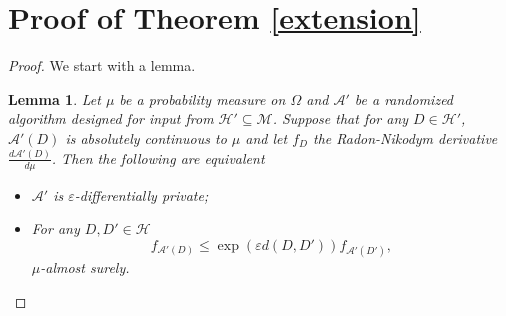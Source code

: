 \documentclass[12pt,a4paper]{article}
\numberwithin{equation}{section}
\newtheorem{lemma}[theorem]{Lemma}
\numberwithin{equation}{section}
\renewcommand{\epsilon}{\varepsilon}
\newcommand{\1}{{\text{\Large $\mathfrak 1$}}}
\newcommand{\2}[1]{{\text{\Large $\mathfrak 1$}\!\left(#1\right)}}
\begin{document}
\section{Proof of Theorem \ref{extension}}
\begin{proof}  We start with a lemma.
\begin{lemma}\label{lem}
Let $\mu$ be a probability measure on $\Omega$ and $\mathcal{A}'$ be a randomized algorithm designed for input from $\mathcal{H}' \subseteq \mathcal{M}$. Suppose that for any $D \in \mathcal{H}'$, $\mathcal{A}'(D)$ is absolutely continuous to $\mu$ and let $f_D$ the Radon-Nikodym derivative $\frac{d\mathcal{A}'(D)}{d\mu}$. Then the following are equivalent \begin{itemize} \item[(1)] $\mathcal{A}'$ is $\epsilon$-differentially private; \item[(2)] For any $D,D' \in \mathcal{H}$ \begin{equation}\label{prime}  f_{\mathcal{A}'(D)} \leq \exp \left(\epsilon d(D,D') \right) f_{\mathcal{A}'(D')}, \end{equation}$\mu$-almost surely. 
\end{itemize}
\end{lemma}


\end{proof}
\end{document}
